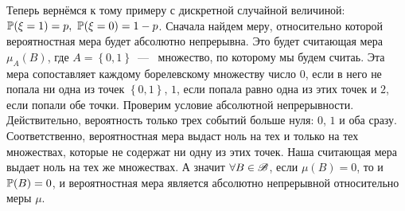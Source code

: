 \documentclass[../TV&MS.tex]{subfiles}
\begin{document}
\begin{Ex}
    Теперь вернёмся к тому примеру с дискретной случайной величиной:
    $\mathbb{P}(\xi = 1) = p,\ \mathbb{P}(\xi = 0) = 1 - p$.
    Сначала найдем меру, относительно которой вероятностная мера будет абсолютно непрерывна.
    Это будет считающая мера $\mu_A(B)$, где $A = \left\{ 0, 1 \right\}$~---~
    множество, по которому мы будем считаь.
    Эта мера сопоставляет каждому борелевскому множеству число $0$,
    если в него не попала ни одна из точек $\left\{ 0, 1 \right\}$,
    $1$, если попала равно одна из этих точек и $2$, если попали обе точки.
    Проверим условие абсолютной непрерывности.
    Действительно, вероятность только трех событий больше нуля:
    $0$, $1$ и оба сразу.
    Соответственно, вероятностная мера выдаст ноль на тех и только на тех множествах,
    которые не содержат ни одну из этих точек.
    Наша считающая мера выдает ноль на тех же множествах.
    А значит $\forall B \in \mathscr{B}$, если $\mu(B) = 0$, то и $\mathbb{P}(B) = 0$,
    и вероятностная мера является абсолютно непрерывной относительно меры $\mu$.


\end{Ex}
\end{document}
